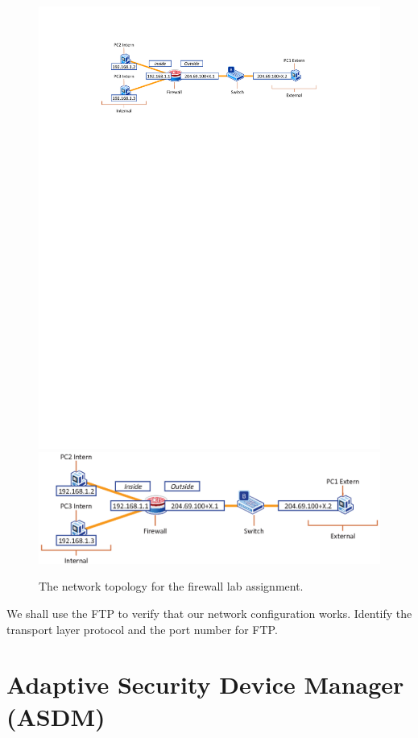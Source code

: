 \begin{figure}
\centering
\ifpdf
\includegraphics[width=0.9\linewidth]{Figures/Firewall.pdf}
\else
\includegraphics[width=0.9\linewidth]{Figures/Firewall.eps}
\fi
\caption{The network topology for the firewall lab assignment.}
\label{fig:Firewall}
\end{figure}

We shall use the FTP to verify that our network configuration works. Identify the transport layer protocol and the port number for FTP.

\section{Adaptive Security Device Manager (ASDM)}

